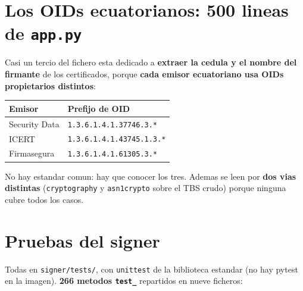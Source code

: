 \documentclass[11pt,a4paper,oneside]{report}
\newcommand{\rt}[1]{\texttt{#1}}
\begin{document}
\section{Los OIDs ecuatorianos: 500 lineas de \rt{app.py}}

Casi un tercio del fichero esta dedicado a \textbf{extraer la cedula y el nombre del firmante}
de los certificados, porque \textbf{cada emisor ecuatoriano usa OIDs propietarios distintos}:

\begin{center}
\footnotesize
\begin{tabularx}{\textwidth}{@{}P{4.0cm}L@{}}
\toprule
\textbf{Emisor} & \textbf{Prefijo de OID} \\
\midrule
Security Data & \rt{1.3.6.1.4.1.37746.3.*} \\
ICERT         & \rt{1.3.6.1.4.1.43745.1.3.*} \\
Firmasegura   & \rt{1.3.6.1.4.1.61305.3.*} \\
\bottomrule
\end{tabularx}
\end{center}

No hay estandar comun: hay que conocer los tres. Ademas se leen por \textbf{dos vias distintas}
(\rt{cryptography} y \rt{asn1crypto} sobre el TBS crudo) porque ninguna cubre todos los casos.

\section{Pruebas del signer}

Todas en \rt{signer/tests/}, con \rt{unittest} de la biblioteca estandar (no hay pytest en la
imagen). \textbf{266 metodos \rt{test\_}} repartidos en nueve ficheros:
\end{document}
